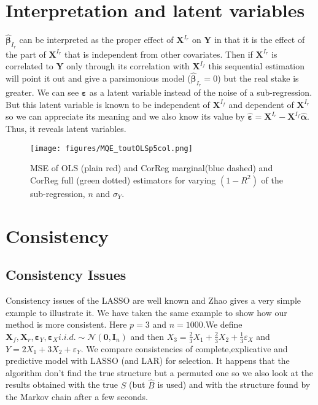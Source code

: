 \documentclass[12pt,a4paper]{report}
\begin{document}
	\section{Interpretation and latent variables}
			$\hat{\boldsymbol{\beta}}_{I_r}$ can be interpreted as the proper effect of $\boldsymbol{X}^{I_r}$ on $\boldsymbol{Y}$ in that it is the effect of the part of $\boldsymbol{X}^{I_r}$ that is independent from other covariates. Then if $\boldsymbol{X}^{I_r}$ is correlated to $\boldsymbol{Y}$ only through its correlation with $\boldsymbol{X}^{I_f}$ this sequential estimation will point it out and give a parsimonious model ($\hat{\boldsymbol{\beta}}_{I_r}=0$) but the real stake is greater. We can see $\boldsymbol{\varepsilon}$ as a latent variable instead of the noise of a sub-regression. But this latent variable is known to be independent of $\boldsymbol{X}^{I_f}$ and dependent of $\boldsymbol{X}^{I_r}$ so we can appreciate its meaning and we also know its value by $\hat{\boldsymbol{\varepsilon}}=\boldsymbol{X}^{I_r}-\boldsymbol{X}^{I_f}\hat{\boldsymbol{\alpha}}$. Thus, it reveals latent variables.
			
	
\begin{figure}[h!]
	\texttt{[image: figures/MQE\_toutOLSp5col.png]}\label{MQE2}
	\caption{MSE of OLS (plain red) and CorReg marginal(blue dashed) and CorReg full (green dotted) estimators for varying $(1-R^2)$ of the sub-regression, $n$ and $\sigma_Y$.}
\end{figure}	
	
	\section{Consistency}
		\subsection{Consistency Issues}\label{consistency}
		Consistency issues of the LASSO are well known and Zhao \cite{Zhao2006MSC} gives a very simple example to illustrate it.
		We have taken the same example to show how our method is more consistent.
		Here $p=3$ and $n=1000$.We define $\boldsymbol{X}_f,\boldsymbol{X}_r,\boldsymbol{\varepsilon}_Y,\boldsymbol{\varepsilon}_{X} i.i.d. \sim \mathcal{N}(\boldsymbol{0},\boldsymbol{I}_n)$ and then $X_3=\frac{2}{3}X_1+\frac{2}{3}X_2+\frac{1}{3}\varepsilon_X$ and $Y=2X_1+3X_2+\varepsilon_Y$.
		We compare consistencies of complete,explicative and predictive model with LASSO (and LAR) for selection.
		It happens that the algorithm don't find the true structure but a permuted one so we also look at the results obtained with the true $S$ (but $\hat{B}$ is used) and with the structure found by the Markov chain after a few seconds.
		
\end{document}
